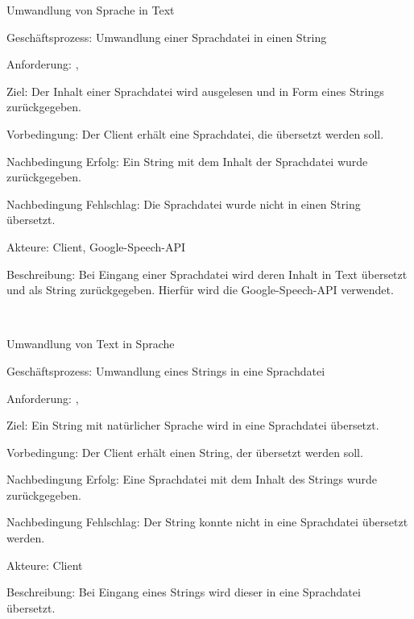 \pagebreak[2]

\begin{function}{12}{Umwandlung von Sprache in Text}
\item[Geschäftsprozess:] Umwandlung einer Sprachdatei in einen String
\item[Anforderung:] , 
\item[Ziel:] Der Inhalt einer Sprachdatei wird ausgelesen und in Form eines Strings zurückgegeben.
\item[Vorbedingung:] Der Client erhält eine Sprachdatei, die übersetzt werden soll.
\item[Nachbedingung Erfolg:] Ein String mit dem Inhalt der Sprachdatei wurde zurückgegeben.
\item[Nachbedingung Fehlschlag:] Die Sprachdatei wurde nicht in einen String übersetzt.
\item[Akteure:] Client, Google-Speech-API
\item[Beschreibung:] Bei Eingang einer Sprachdatei wird deren Inhalt in Text übersetzt und als String zurückgegeben. Hierfür wird die Google-Speech-API verwendet.
\end{function} ~

\begin{function}{13}{Umwandlung von Text in Sprache}
\item[Geschäftsprozess:] Umwandlung eines Strings in eine Sprachdatei
\item[Anforderung:] , 
\item[Ziel:] Ein String mit natürlicher Sprache wird in eine Sprachdatei übersetzt.
\item[Vorbedingung:] Der Client erhält einen String, der übersetzt werden soll.
\item[Nachbedingung Erfolg:] Eine Sprachdatei mit dem Inhalt des Strings wurde zurückgegeben.
\item[Nachbedingung Fehlschlag:] Der String konnte nicht in eine Sprachdatei übersetzt werden.
\item[Akteure:] Client
\item[Beschreibung:] Bei Eingang eines Strings wird dieser in eine Sprachdatei übersetzt.
\end{function} ~

